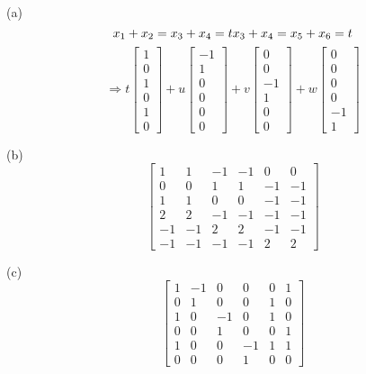 \documentclass[a4paper,12pt]{article}
\begin{document}
(a)
\[
\begin{subequations}
x_1+x_2=x_3+x_4=t \\
x_3+x_4=x_5+x_6=t
\end{subequations}
\]
\[
\Rightarrow t \begin{bmatrix} 1 \\ 0 \\ 1 \\ 0 \\ 1 \\0 \end{bmatrix} + u \begin{bmatrix} -1 \\ 1 \\ 0 \\ 0 \\ 0 \\ 0\end{bmatrix} + v \begin{bmatrix} 0 \\ 0 \\ -1 \\ 1 \\ 0  \\ 0 \end{bmatrix} + w \begin{bmatrix} 0 \\ 0 \\ 0 \\ 0 \\ -1 \\ 1 \end{bmatrix}
\]

(b)
\[
\begin{bmatrix} 1 & 1 & -1 & -1 & 0 & 0 \\ 0 & 0 & 1 & 1 & -1 & -1 \\ 1 & 1 & 0 & 0 & -1 & -1 \\ 2 & 2 & -1 & -1 & -1 & -1 \\ -1 & -1 & 2 & 2 & -1 & -1 \\-1 & -1 & -1 & -1 & 2 & 2 \end{bmatrix}
\]


(c)
\[
\begin{bmatrix} 1 & -1 & 0 & 0 & 0 & 1 \\ 0 & 1 & 0 & 0 & 1 & 0 \\ 1 & 0 & -1 & 0 & 1 & 0 \\ 0 & 0 & 1 & 0 & 0 & 1 \\ 1 & 0 & 0 & -1 & 1 & 1 \\ 0 & 0 & 0 & 1 & 0 & 0 \end{bmatrix}
\]
\end{document}
